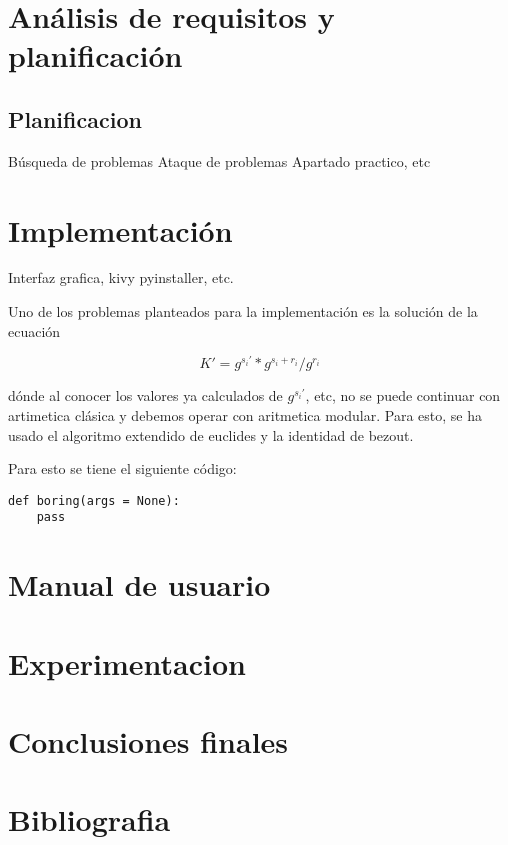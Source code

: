 \documentclass[11pt, spanish]{report}
\begin{document}
\section{Análisis de requisitos y planificación}
    \subsection{Planificacion }
    Búsqueda de problemas
    Ataque de problemas
    Apartado practico, etc

\section{Implementación}
Interfaz grafica, kivy pyinstaller, etc. 

Uno de los problemas planteados para la implementación es la solución de la ecuación

\begin{equation}
    K' = g^{s_{i}'} * g^{s_{i}+r_{i}} / g^{r_{i}}
\end{equation}

dónde al conocer los valores ya calculados de $ g^{s_{i}'} $, etc, no se puede continuar con artimetica clásica y debemos operar con aritmetica modular. Para esto, se ha usado el algoritmo extendido de euclides y la identidad de bezout. 

Para esto se tiene el siguiente código:

\begin{lstlisting}
def boring(args = None):
    pass
\end{lstlisting}


\section{Manual de usuario}

\section{Experimentacion}
\section{Conclusiones finales}
\section{Bibliografia}
\end{document}
